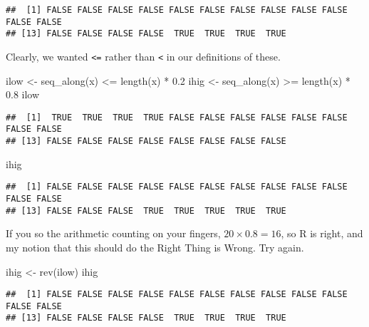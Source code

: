 \documentclass[
]{article}
\newenvironment{Shaded}{\begin{snugshade}}{\end{snugshade}}
\newcommand{\FloatTok}[1]{\textcolor[rgb]{0.00,0.00,0.81}{#1}}
\newcommand{\FunctionTok}[1]{\textcolor[rgb]{0.00,0.00,0.00}{#1}}
\newcommand{\NormalTok}[1]{#1}
\newcommand{\OtherTok}[1]{\textcolor[rgb]{0.56,0.35,0.01}{#1}}
\newcommand{\SpecialCharTok}[1]{\textcolor[rgb]{0.00,0.00,0.00}{#1}}
\begin{document}
\begin{verbatim}
##  [1] FALSE FALSE FALSE FALSE FALSE FALSE FALSE FALSE FALSE FALSE FALSE FALSE
## [13] FALSE FALSE FALSE FALSE  TRUE  TRUE  TRUE  TRUE
\end{verbatim}

Clearly, we wanted \texttt{\textless{}=} rather than
\texttt{\textless{}} in our definitions of these.

\begin{Shaded}
\begin{Highlighting}[]
\NormalTok{ilow }\OtherTok{\textless{}{-}} \FunctionTok{seq\_along}\NormalTok{(x) }\SpecialCharTok{\textless{}=} \FunctionTok{length}\NormalTok{(x) }\SpecialCharTok{*} \FloatTok{0.2}
\NormalTok{ihig }\OtherTok{\textless{}{-}} \FunctionTok{seq\_along}\NormalTok{(x) }\SpecialCharTok{\textgreater{}=} \FunctionTok{length}\NormalTok{(x) }\SpecialCharTok{*} \FloatTok{0.8}
\NormalTok{ilow}
\end{Highlighting}
\end{Shaded}

\begin{verbatim}
##  [1]  TRUE  TRUE  TRUE  TRUE FALSE FALSE FALSE FALSE FALSE FALSE FALSE FALSE
## [13] FALSE FALSE FALSE FALSE FALSE FALSE FALSE FALSE
\end{verbatim}

\begin{Shaded}
\begin{Highlighting}[]
\NormalTok{ihig}
\end{Highlighting}
\end{Shaded}

\begin{verbatim}
##  [1] FALSE FALSE FALSE FALSE FALSE FALSE FALSE FALSE FALSE FALSE FALSE FALSE
## [13] FALSE FALSE FALSE  TRUE  TRUE  TRUE  TRUE  TRUE
\end{verbatim}

If you so the arithmetic counting on your fingers,
\(20 \times 0.8 = 16\), so R is right, and my notion that this should do
the Right Thing is Wrong. Try again.

\begin{Shaded}
\begin{Highlighting}[]
\NormalTok{ihig }\OtherTok{\textless{}{-}} \FunctionTok{rev}\NormalTok{(ilow)}
\NormalTok{ihig}
\end{Highlighting}
\end{Shaded}

\begin{verbatim}
##  [1] FALSE FALSE FALSE FALSE FALSE FALSE FALSE FALSE FALSE FALSE FALSE FALSE
## [13] FALSE FALSE FALSE FALSE  TRUE  TRUE  TRUE  TRUE
\end{verbatim}
\end{document}
